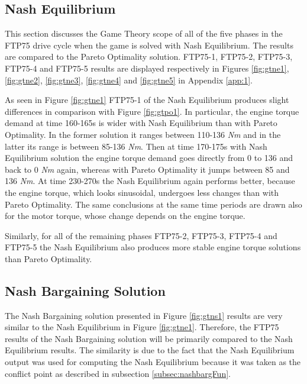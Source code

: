 \subsection{Nash Equilibrium}
This section discusses the Game Theory scope of all of the five phases in the FTP75 drive cycle when the game is solved with Nash Equilibrium. The results are compared to the Pareto Optimality solution. FTP75-1, FTP75-2, FTP75-3, FTP75-4 and FTP75-5 results are displayed respectively in Figures \ref{fig:gtne1}, \ref{fig:gtne2}, \ref{fig:gtne3}, \ref{fig:gtne4} and \ref{fig:gtne5} in Appendix \ref{app:1}.

As seen in Figure \ref{fig:gtne1} FTP75-1 of the Nash Equilibrium produces slight differences in comparison with Figure \ref{fig:gtpo1}. In particular, the engine torque demand at time 160-165s is wider with Nash Equilibrium than with Pareto Optimality. In the former solution it ranges between 110-136 \textit{Nm} and in the latter its range is between 85-136 \textit{Nm}. Then at time 170-175s with Nash Equilibrium solution the engine torque demand goes directly from 0 to 136 and back to 0 \textit{Nm} again, whereas with Pareto Optimality it jumps between 85 and 136 \textit{Nm}. At time 230-270s the Nash Equilibrium again performs better, because the engine torque, which looks sinusoidal, undergoes less changes than with Pareto Optimality. The same conclusions at the same time periods are drawn also for the motor torque, whose change depends on the engine torque.

Similarly, for all of the remaining phases FTP75-2, FTP75-3, FTP75-4 and FTP75-5 the Nash Equilibrium also produces more stable engine torque solutions than Pareto Optimality.

\subsection{Nash Bargaining Solution}
The Nash Bargaining solution presented in Figure \ref{fig:gtns1} results are very similar to the Nash Equilibrium in Figure \ref{fig:gtne1}. Therefore, the FTP75 results of the Nash Bargaining solution will be primarily compared to the Nash Equilibrium results. The similarity is due to the fact that the Nash Equilibrium output was used for computing the Nash Equilibrium because it was taken as the conflict point as described in subsection \ref{subsec:nashbargFun}.

